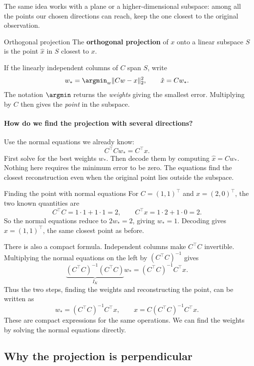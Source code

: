 \documentclass[a4paper,12pt,oneside]{report}
\begin{document}
The same idea works with a plane or a higher-dimensional subspace:
among all the points our chosen directions can reach, keep the one
closest to the original observation.

\begin{frameddefn}{Orthogonal projection}\label{def:orthogonal-projection}
The \textbf{orthogonal projection} of $x$ onto a linear subspace
$S$ is the point $\hat{x}$ in $S$ closest to $x$.

If the linearly independent columns of $C$ span $S$, write
\[
  w_*=\argmin_w\lVert Cw-x\rVert_2^2,\qquad
  \hat{x}=Cw_*.
\]
The notation $\argmin$ returns the \emph{weights} giving the smallest
error. Multiplying by $C$ then gives the \emph{point} in the subspace.
\end{frameddefn}

\paragraph{How do we find the projection with several directions?}
Use the normal equations we already know:
\[
  C^\top Cw_*=C^\top x.
\]
First solve for the best weights $w_*$. Then decode them by computing
$\hat{x}=Cw_*$. Nothing here requires the minimum error to be zero.
The equations find the closest reconstruction even when the original
point lies outside the subspace.

\begin{framedexample}{Finding the point with normal equations}
For $C=(1,1)^\top$ and $x=(2,0)^\top$, the two known quantities are
\[
  C^\top C=1\cdot1+1\cdot1=2,\qquad
  C^\top x=1\cdot2+1\cdot0=2.
\]
So the normal equations reduce to $2w_*=2$, giving $w_*=1$.
Decoding gives $\hat{x}=(1,1)^\top$, the same closest point as before.
\end{framedexample}

There is also a compact formula. Independent columns make
$C^\top C$ invertible. Multiplying the normal equations on the left
by $(C^\top C)^{-1}$ gives
\[
  \underbrace{(C^\top C)^{-1}(C^\top C)}_{I_K}w_*
   =(C^\top C)^{-1}C^\top x.
\]
Thus the two steps, finding the weights and reconstructing the point,
can be written as
\[
  w_*=(C^\top C)^{-1}C^\top x,\qquad
  \hat{x}=C(C^\top C)^{-1}C^\top x.
\]
These are compact expressions for the same operations. We can find
the weights by solving the normal equations directly.

\subsection{Why the projection is perpendicular}
\end{document}
